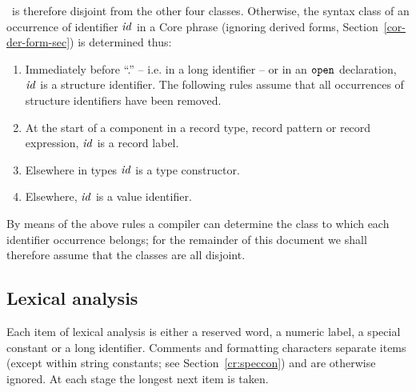 \TyId\ is therefore disjoint %
from the other four classes.   Otherwise, the syntax class of an occurrence of
identifier ${\it id}$ in a Core phrase (ignoring derived forms, 
Section~\ref{cor-der-form-sec}) is determined thus:
\begin{enumerate}
  \item Immediately before ``.'' -- i.e. in a long identifier -- or in an
        ${\tt open}$ declaration, ${\it id}$ is a structure
        identifier.  The following rules assume that all occurrences of
        structure identifiers have been removed.
  \item At the start of a component in a record type, record pattern or record
        expression,  ${\it id}$ is a record label.
  \item Elsewhere in types ${\it id}$ is a type constructor.
   \item Elsewhere, ${\it id}$ is a value identifier.
\end{enumerate}

By means of the above rules a compiler can determine the class to which each
identifier occurrence belongs; for the remainder of this document we shall
therefore assume that the classes are all disjoint.

\subsection{Lexical analysis}
Each item of lexical analysis is either a reserved word, a numeric label, a
special constant or a long identifier.
Comments and formatting characters
separate items (except within string constants; see Section~\ref{cr:speccon})
and are otherwise
ignored.   At each stage the longest next item is taken.


